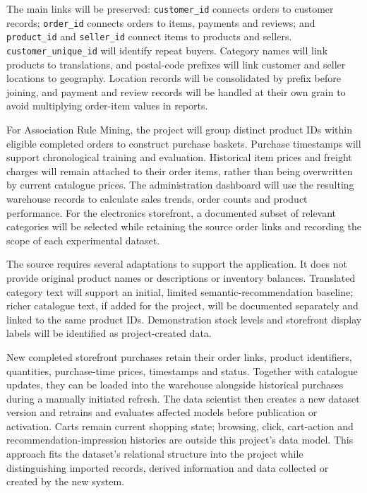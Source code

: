 \documentclass[a4paper,12pt]{article}
\begin{document}
The main links will be preserved: \nolinkurl{customer_id} connects orders to
customer records; \nolinkurl{order_id} connects orders to items, payments and
reviews; and \nolinkurl{product_id} and \nolinkurl{seller_id} connect items to
products and sellers. \nolinkurl{customer_unique_id} will identify repeat buyers.
Category names will link products to translations, and postal-code prefixes will
link customer and seller locations to geography. Location records will be
consolidated by prefix before joining, and payment and review records will be
handled at their own grain to avoid multiplying order-item values in reports.

For Association Rule Mining, the project will group distinct product IDs within
eligible completed orders to construct purchase baskets. Purchase timestamps will
support chronological training and evaluation. Historical item prices and freight
charges will remain attached to their order items, rather than being overwritten
by current catalogue prices. The administration dashboard will use the resulting
warehouse records to calculate sales trends, order counts and product performance.
For the electronics storefront, a documented subset of relevant categories will be
selected while retaining the source order links and recording the scope of each
experimental dataset.

The source requires several adaptations to support the application. It does not provide original
product names or descriptions or inventory balances. Translated category text will support an
initial, limited semantic-recommendation baseline; richer catalogue text, if added for the project,
will be documented separately and linked to the same product IDs. Demonstration stock levels and
storefront display labels will be identified as project-created data.

New completed storefront purchases retain their order links, product identifiers, quantities,
purchase-time prices, timestamps and status. Together with catalogue updates, they can be loaded
into the warehouse alongside historical purchases during a manually initiated refresh. The data
scientist then creates a new dataset version and retrains and evaluates affected models before
publication or activation. Carts remain current shopping state; browsing, click, cart-action and
recommendation-impression histories are outside this project's data model. This approach fits the
dataset's relational structure into the project while distinguishing imported records, derived
information and data collected or created by the new system.
\end{document}
